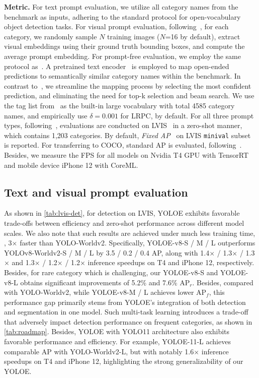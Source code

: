 \documentclass[10pt,twocolumn,letterpaper]{article}
\begin{document}
\textbf{Metric.} For text prompt evaluation, we utilize all category names from the benchmark as inputs, adhering to the standard protocol for open-vocabulary object detection tasks. For visual prompt evaluation, following~\cite{jiang2024trex2}, for each category, we randomly sample $N$ training images ($N$=16 by default), extract visual embeddings using their ground truth bounding boxes, and compute the average prompt embedding. For prompt-free evaluation, we employ the same protocol as~\cite{lin2024generateu}. A pretrained text encoder~\cite{vasu2024mobileclip} is employed to map open-ended predictions to semantically similar category names within the benchmark. In contrast to~\cite{lin2024generateu}, we streamline the mapping process by selecting the most confident prediction, and eliminating the need for top-k selection and beam search. We use the tag list from~\cite{huang2023ram} as the built-in large vocabulary with total 4585 category names, and empirically use $\delta=0.001$ for LRPC, by default. For all three prompt types, following~\cite{cheng2024yoloworld,jiang2024trex2,lin2024generateu}, evaluations are conducted on LVIS~\cite{gupta2019lvis} in a zero-shot manner, which contains 1,203 categories. By default, \textit{Fixed AP}~\cite{dave2021evaluating} on LVIS \texttt{minival} subset is reported. For transferring to COCO, standard AP is evaluated, following~\cite{bochkovskiy2020yolov4,jocherultralytics}. Besides, we measure the FPS for all models on Nvidia T4 GPU with TensorRT and mobile device iPhone 12 with CoreML.

\subsection{Text and visual prompt evaluation}
As shown in \cref{tab:lvis-det}, for detection on LVIS, YOLOE exhibits favorable trade-offs between efficiency and zero-shot performance across different model scales. We also note that such results are achieved under much less training time, \eg, 3$\times$ faster than YOLO-Worldv2. Specifically, YOLOE-v8-S / M / L outperforms YOLOv8-Worldv2-S / M / L by 3.5 / 0.2 / 0.4 AP, along with 1.4$\times$ / 1.3$\times$ / 1.3$\times$ and 1.3$\times$ / 1.2$\times$ / 1.2$\times$ inference speedups on T4 and iPhone 12, respectively. Besides, for rare category which is challenging, our YOLOE-v8-S and YOLOE-v8-L obtains significant improvements of 5.2\% and 7.6\% AP$_r$. Besides, compared with YOLO-Worldv2, while YOLOE-v8-M / L achieves lower AP$_f$, this performance gap primarily stems from YOLOE's integration of both detection and segmentation in one model. Such multi-task learning introduces a trade-off that adversely impact detection performance on frequent categories, as shown in \cref{tab:roadmap}. Besides, YOLOE with YOLO11 architecture also exhibits favorable performance and efficiency. For example, YOLOE-11-L achieves comparable AP with YOLO-Worldv2-L, but with notably 1.6$\times$ inference speedups on T4 and iPhone 12, highlighting the strong generalizability of our YOLOE. 
\end{document}
